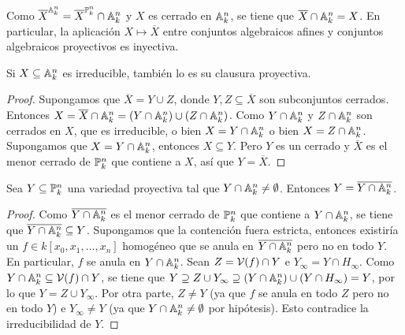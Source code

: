 \documentclass[ACGA.tex]{subfiles}
\begin{document}

 
Como ${\overline X}^{\mathbb{A}^n_k}={\overline X}^{\mathbb{P}^n_k}\cap \mathbb{A}^n_k$ y $X$ es cerrado en $\mathbb{A}^n_k$, se tiene que ${\overline X}\cap\mathbb{A}^n_k=X$. En particular, la aplicación $X\mapsto\overline X$ entre conjuntos algebraicos afines y conjuntos algebraicos proyectivos es inyectiva.

\begin{lemma} Si $X\subseteq\mathbb{A}^n_k$ es irreducible, también lo es su clausura proyectiva.
 \end{lemma}

\begin{proof}
 Supongamos que $\overline X=Y\cup Z$, donde $Y,Z\subseteq\overline X$ son subconjuntos cerrados. Entonces $X={\overline X}\cap\mathbb{A}^n_k=(Y\cap\mathbb{A}^n_k)\cup(Z\cap\mathbb{A}^n_k)$. Como $Y\cap\mathbb{A}^n_k$ y $Z\cap\mathbb{A}^n_k$ son cerrados en $X$, que es irreducible, o bien $X=Y\cap\mathbb{A}^n_k$ o bien $X=Z\cap\mathbb{A}^n_k$. Supongamos que $X=Y\cap\mathbb{A}^n_k$, entonces $X\subseteq Y$. Pero $Y$ es un cerrado y $\overline X$ es el menor cerrado de $\mathbb{P}^n_k$ que contiene a $X$, así que $Y=\overline X$.
\end{proof}


\begin{prop}
 Sea $Y\subseteq\mathbb{P}^n_k$ una variedad proyectiva tal que $Y\cap \mathbb{A}^n_k\neq\emptyset$. Entonces $Y=\overline{Y\cap\mathbb{A}^n_k}$.
\end{prop}

\begin{proof}
 Como $\overline{Y\cap\mathbb{A}^n_k}$ es el menor cerrado de $\mathbb{P}^n_k$ que contiene a $Y\cap\mathbb{A}^n_k$, se tiene que $\overline{Y\cap\mathbb{A}^n_k}\subseteq Y$. Supongamos que la contención fuera estricta, entonces existiría un $f\in k[x_0,x_1,\ldots,x_n]$ homogéneo que se anula en $\overline{Y\cap\mathbb{A}^n_k}$ pero no en todo $Y$. En particular, $f$ se anula en $Y\cap\mathbb{A}^n_k$. Sean $Z=\mathcal{V}(f)\cap Y$ e $Y_\infty=Y\cap H_\infty$. Como $Y\cap\mathbb{A}^n_k\subseteq\mathcal{V}(f)\cap Y$, se tiene que $Y\supseteq Z\cup Y_\infty\supseteq (Y\cap\mathbb{A}^n_k)\cup(Y\cap H_\infty)=Y$, por lo que $Y=Z\cup Y_\infty$. Por otra parte, $Z\neq Y$ (ya que $f$ se anula en todo $Z$ pero no en todo $Y$) e $Y_\infty\neq Y$ (ya que $Y\cap\mathbb{A}^n_k\neq\emptyset$ por hipótesis). Esto contradice la irreducibilidad de $Y$. 
\end{proof}
\end{document}
